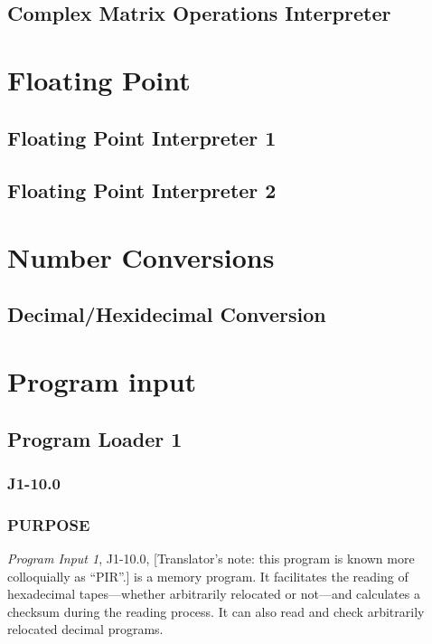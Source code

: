 \documentclass{article}
\begin{document}
\begin{enumerate}\newpage

\subsection{Complex Matrix Operations Interpreter}
\newpage

\section{Floating Point}
\subsection{Floating Point Interpreter 1}
\label{H1-11.0}
\newpage

\subsection{Floating Point Interpreter 2}
\label{H1-11.1}
\newpage

\section{Number Conversions}
\subsection{Decimal/Hexidecimal Conversion}
\newpage
\section{Program input}
\subsection{Program Loader 1}
\subsubsection*{J1-10.0}
\label{sec:PIRloader}
\subsubsection*{PURPOSE}

\emph{Program Input 1}, J1-10.0, [Translator's note: this program is known more colloquially as ``PIR''.] is a memory program. It facilitates the reading of hexadecimal tapes—whether arbitrarily relocated or not—and calculates a checksum during the reading process. It can also read and check arbitrarily relocated decimal programs.


\end{enumerate}
\end{document}
